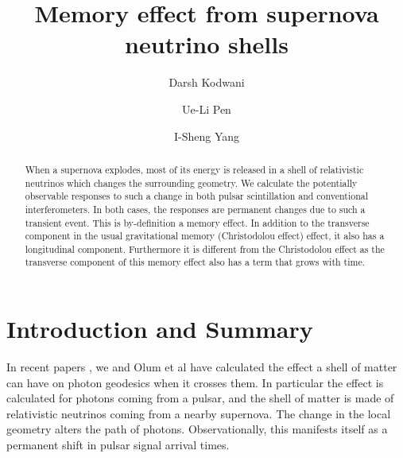 \documentclass[aps,showpacs,onecolumn,floats,prd,superscriptaddress,nofootinbib]{revtex4-1}
\begin{document}
\title{Memory effect from supernova neutrino shells}

\author{Darsh Kodwani}

\author{Ue-Li Pen}

\author{I-Sheng Yang}

\begin{abstract}
When a supernova explodes, most of its energy is released in a shell of relativistic neutrinos which changes the surrounding geometry.
We calculate the potentially observable responses to such a change in both pulsar scintillation and conventional interferometers.
In both cases, the responses are permanent changes due to such a transient event.
This is by-definition a memory effect.
In addition to the transverse component in the usual gravitational memory (Christodolou effect) effect, it also has a longitudinal component. 
Furthermore it is different from the Christodolou effect as the transverse component of this memory effect also has a term that grows with time. 
\end{abstract}

\maketitle

\section{Introduction and Summary}

In recent papers \cite{Olum:2013gza, PhysRevD.93.103006}, we and Olum et al have calculated the effect a shell of matter can have on photon geodesics when it crosses them. 
In particular the effect is calculated for photons coming from a pulsar, and the shell of matter is made of relativistic neutrinos coming from a nearby supernova.
The change in the local geometry alters the path of photons.
Observationally, this manifests itself as a permanent shift in pulsar signal arrival times. 
\end{document}

